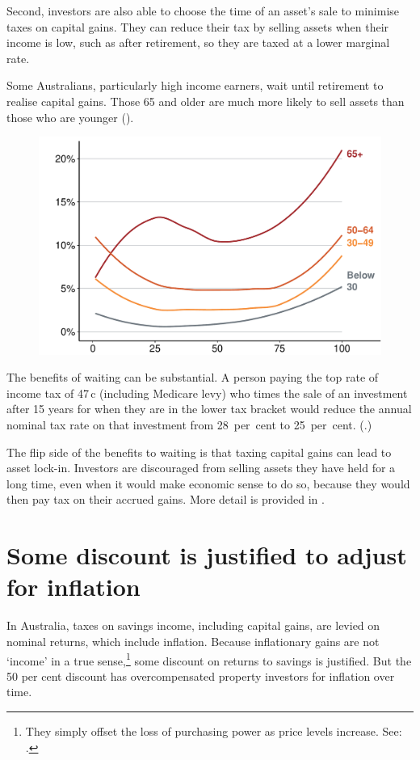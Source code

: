\documentclass{grattanAlpha}\usepackage[]{graphicx}\usepackage[]{color}
\begin{document}
Second, investors are also able to choose the time of an asset's sale to minimise taxes on capital gains. They can reduce their tax by selling assets when their income is low, such as after retirement, so they are taxed at a lower marginal rate. 

Some Australians, particularly high income earners, wait until retirement to realise capital gains. Those 65 and older are much more likely to sell assets than those who are younger ().

\begin{figure}
\label{fig:CGT-by-age-income}
\includegraphics[width=\columnwidth]{CGT-NG-atlas//CGT-by-age-taxable-income-1}
\end{figure}

The benefits of waiting can be substantial. A person paying the top rate of income tax of 47\,c (including Medicare levy) who times the sale of an investment after 15 years for when they are in the lower tax bracket would reduce the annual nominal tax rate on that investment from 28~per~cent to 25~per~cent. (.)

The flip side of the benefits to waiting is that taxing capital gains can lead to asset lock-in. Investors are discouraged from selling assets they have held for a long time, even when it would make economic sense to do so,  because they would then pay tax on their accrued gains. More detail is provided in .  


\section{Some discount is justified to adjust for inflation}
In Australia, taxes on savings income, including capital gains, are levied on nominal returns, which include inflation. Because inflationary gains are not `income' in a true sense,\footnote{They simply offset the loss of purchasing power as price levels increase. See: \textcite[][58]{Treasury2015ReThink}.}  some discount on returns to savings is justified. But the 50 per cent discount has overcompensated property investors for inflation over time. 
\end{document}
